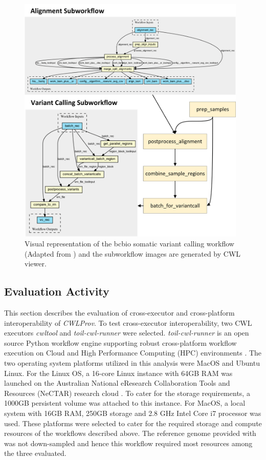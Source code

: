 \documentclass[a4paper,num-refs]{oup-contemporary}
\begin{document}
\begin{figure} [t!] %
\centering
\includegraphics[width=.65\textwidth, height=120mm]{images/2variantcalling.png}
\captionsetup{justification=centering}
\caption{Visual representation of the bcbio somatic variant calling workflow (Adapted from \citep{bcbiocwl}) and the subworkflow images are generated by CWL viewer.}\label{fig:somatic}
\end{figure}

\subsection{Evaluation Activity}  \label{eval-activity}
This section describes the evaluation of cross-executor and cross-platform interoperability of \textit{CWLProv}. To test cross-executor interoperability, two CWL executors \textit{cwltool} and \textit{toil-cwl-runner} were selected. \textit{toil-cwl-runner} is an open source Python workflow engine supporting robust cross-platform workflow execution on Cloud and High Performance Computing (HPC) environments \citep{vivian2017toil}. The two operating system platforms utilized in this analysis were MacOS and Ubuntu Linux. For the Linux OS, a 16-core Linux instance with 64GB RAM was launched on the Australian National eResearch Collaboration Tools and Resources (NeCTAR) research cloud \citep{Nectar}. To cater for the storage requirements, a 1000GB persistent volume was attached to this instance. For MacOS, a local system with 16GB RAM, 250GB storage and 2.8 GHz Intel Core i7 processor was used. These platforms were selected to cater for the required storage and compute resources of the workflows described above. The reference genome provided with  was not down-sampled and hence this workflow required most resources among the three evaluated. 
\end{document}

